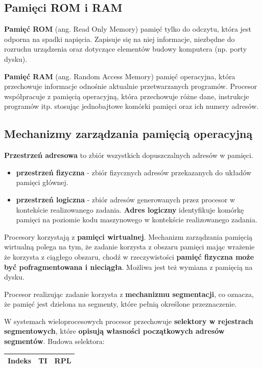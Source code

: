 \documentclass{article}
\begin{document}
\subsection{Pamięci ROM i RAM}
\textbf{Pamięć ROM} (ang. Read Only Memory) pamięć tylko do odczytu, która jest odporna na spadki napięcia. Zapisuje się na niej informacje, niezbędne do rozruchu urządzenia oraz dotyczące elementów budowy komputera (np. porty dysku).

\textbf{Pamięć RAM} (ang. Random Access Memory) pamięć operacyjna, która
przechowuje informacje odnośnie aktualnie przetwarzanych programów. Procesor współpracuje z pamięcią operacyjną, która przechowuje różne dane, instrukcje programów itp. stosując jednobajtowe komórki pamięci oraz ich numery adresów.

\subsection{Mechanizmy zarządzania pamięcią operacyjną}
\textbf{Przestrzeń adresowa} to zbiór wszystkich dopuszczalnych adresów w pamięci.
\begin{itemize}
    \item \textbf{przestrzeń fizyczna} - zbiór fizycznych adresów przekazanych do układów pamięci głównej.
    \item \textbf{przestrzeń logiczna} - zbiór adresów generowanych przez procesor w kontekście realizowanego zadania. \textbf{Adres logiczny} identyfikuje komórkę pamięci na poziomie kodu maszynowego w kontekście realizowanego zadania.
\end{itemize}
Procesory korzystają z \textbf{pamięci wirtualnej}. Mechanizm zarządzania pamięcią wirtualną polega na tym, że zadanie korzysta z obszaru pamięci mając wrażenie że korzysta z ciągłego obszaru, chodź w rzeczywistości \textbf{pamięć fizyczna może być pofragmentowana i nieciągła}. Możliwa jest też wymiana z pamięcią na dysku.

Procesor realizując zadanie korzysta z \textbf{mechanizmu segmentacji}, co oznacza, że pamięć jest dzielona na segmenty, które pełnią określone przeznaczenie.

W systemach wieloprocesowych procesor przechowuje \textbf{selektory w rejestrach segmentowych}, które \textbf{opisują własności początkowych adresów segmentów}. Budowa selektora:
\begin{table}[ht]
\centering
\begin{tabular}{|c|c|c|}
    \hline
    \textbf{Indeks} & \textbf{TI} & \textbf{RPL} \\
    \hline
\end{tabular}
\end{table}
\end{document}
